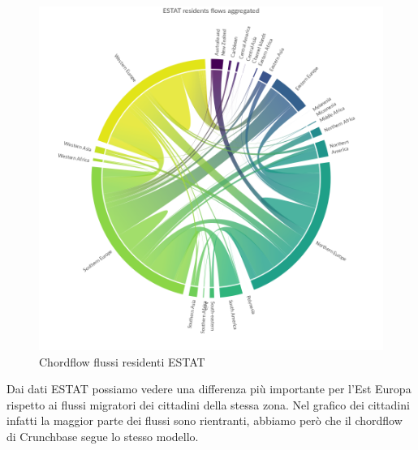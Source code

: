 \begin{figure}[t]
    \centering
    \includegraphics[width=1.0\textwidth]{images/ChordFlows/ESTAT_res_True.png}
    \caption{Chordflow flussi residenti ESTAT}
    \label{fig:chordestatrestrue}
\end{figure}
Dai dati ESTAT possiamo vedere una differenza più importante per l'Est Europa rispetto ai flussi migratori dei cittadini della stessa zona. Nel grafico dei cittadini infatti la maggior parte dei flussi sono rientranti, abbiamo però che il chordflow di Crunchbase segue lo stesso modello.

